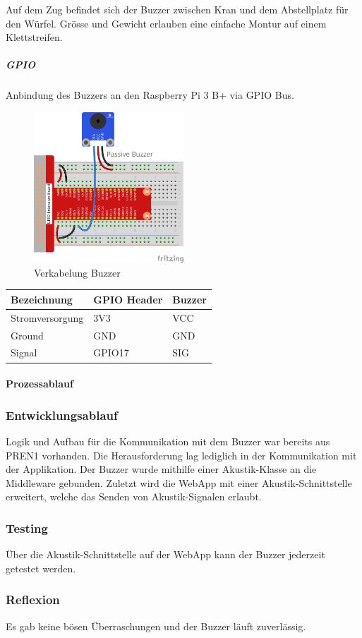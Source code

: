 \documentclass[../../main.tex]{subfiles}
\begin{document}
Auf dem Zug befindet sich der Buzzer zwischen Kran und dem Abstellplatz für den Würfel. Grösse und Gewicht erlauben eine einfache Montur auf einem Klettstreifen.

\subparagraph{GPIO}
Anbindung des Buzzers an den Raspberry Pi 3 B+ via GPIO Bus.

\begin{figure}[H] \centering
    \includegraphics[width=0.5\textwidth]{VerkabelungAkustik}
    \caption{Verkabelung Buzzer}
    \label{fig:Buzzer}
\end{figure}
\begin{table}[H]
    \begin{center}
    \begin{tabular}{lll}
    \hline
    Bezeichnung     & GPIO Header & Buzzer \\ \hline
    Stromversorgung & 3V3      & VCC    \\ \hline
    Ground          & GND      & GND    \\ \hline
    Signal          & GPIO17   & SIG    \\ \hline
    \end{tabular}
    \end{center}
\end{table}

\paragraph{Prozessablauf}

\subsubsection{Entwicklungsablauf}
Logik und Aufbau für die Kommunikation mit dem Buzzer war bereits aus PREN1 vorhanden. Die Herausforderung lag lediglich in der Kommunikation mit der Applikation. Der Buzzer wurde mithilfe einer Akustik-Klasse an die Middleware gebunden. Zuletzt wird die WebApp mit einer Akustik-Schnittstelle erweitert, welche das Senden von Akustik-Signalen erlaubt.

\subsubsection{Testing}
Über die Akustik-Schnittstelle auf der WebApp kann der Buzzer jederzeit getestet werden.

\subsubsection{Reflexion}
Es gab keine bösen Überraschungen und der Buzzer läuft zuverlässig.
\end{document}
